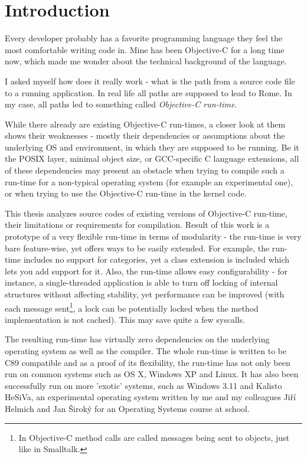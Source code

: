 \chapter*{Introduction}

Every developer probably has a favorite programming language they feel the most comfortable writing code in. Mine has been Objective-C for a long time now, which made me wonder about the technical background of the language.

I asked myself how does it really work - what is the path from a source code file to a running application. In real life all paths are supposed to lead to Rome. In my case, all paths led to something called \emph{Objective-C run-time}.

While there already are existing Objective-C run-times, a closer look at them shows their weaknesses - mostly their dependencies or assumptions about the underlying OS and environment, in which they are supposed to be running. Be it the POSIX layer, minimal object size, or GCC-specific C language extensions, all of these dependencies may present an obstacle when trying to compile such a run-time for a non-typical operating system (for example an experimental one), or when trying to use the Objective-C run-time in the kernel code.

This thesis analyzes source codes of existing versions of Objective-C run-time, their limitations or requirements for compilation. Result of this work is a prototype of a very flexible run-time in terms of modularity - the run-time is very bare feature-wise, yet offers ways to be easily extended. For example, the run-time includes no support for categories, yet a class extension is included which lets you add support for it. Also, the run-time allows easy configurability - for instance, a single-threaded application is able to turn off locking of internal structures without affecting stability, yet performance can be improved (with each message sent\footnote{In Objective-C method calls are called messages being sent to objects, just like in Smalltalk.}, a lock can be potentially locked when the method implementation is not cached). This may save quite a few syscalls.

The resulting run-time has virtually zero dependencies on the underlying operating system as well as the compiler. The whole run-time is written to be C89 compatible and as a proof of its flexibility, the run-time has not only been run on common systems such as OS X, Windows XP and Linux. It has also been successfully run on more 'exotic' systems, such as Windows 3.11 and Kalisto HeSiVa, an experimental operating system written by me and my colleagues Jiří Helmich and Jan Široký for an Operating Systems course at school.
